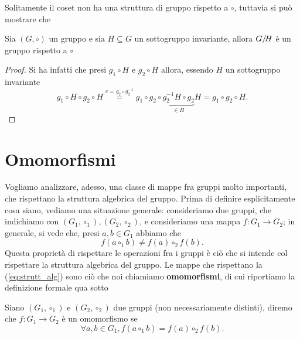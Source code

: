 Solitamente il coset non ha una struttura di gruppo rispetto a $\circ$, tuttavia si può mostrare che
\begin{prop} \label{prop:sott_inv_coset_grupp}
	Sia $(G, \circ)$ un gruppo e sia $H \subseteq G$ un sottogruppo invariante, allora $G/\!{H}$ è un gruppo rispetto a $\circ$
\end{prop} 
\begin{proof}
	Si ha infatti che presi $g_1 \circ H$ e $g_2 \circ H$ allora, essendo $H$ un sottogruppo invariante
	\begin{equation}
		g_1 \circ H \circ g_2 \circ H \stackrel{e = g_2 \circ g_2^{-1}}{=} g_1 \circ g_2 \circ \underbrace{g_2^{-1} H \circ g_2}_{\in H} H = g_1 \circ g_2 \circ H.
	\end{equation}
\end{proof}

\section{Omomorfismi}

Vogliamo analizzare, adesso, una classe di mappe fra gruppi molto importanti, che rispettano la struttura algebrica del gruppo. Prima di definire esplicitamente cosa siano, vediamo una situazione generale:
consideriamo due gruppi, che indichiamo con $(G_1, \circ_1), (G_2, \circ_2)$, e consideriamo una mappa $f: G_1 \to G_2$; in generale, si vede che, presi $a, b \in G_1$ abbiamo che
\begin{equation} \label{eq:strutt_alg}
	f(a \circ_1 b) \neq f(a) \circ_2 f(b).
\end{equation}
Questa proprietà di rispettare le operazioni fra i gruppi è ciò che si intende col rispettare la struttura algebrica del gruppo. Le mappe che rispettano la (\ref{eq:strutt_alg}) sono ciò che noi chiamiamo \textbf{omomorfismi}, di cui riportiamo la definizione formale qua sotto

\begin{definition}[omomorfismo]
	Siano $(G_1, \circ_1)$ e $(G_2, \circ_2)$ due gruppi (non necessariamente distinti), diremo che $f: G_1 \to G_2$ è un omomorfismo se
	\begin{equation}
		\forall a, b \in G_1, f(a \circ_1 b) = f(a) \circ_2 f(b).
	\end{equation}
\end{definition}

